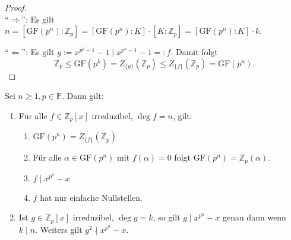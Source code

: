 \begin{proof}{\ } \\
    ``$\Rightarrow$'': Es gilt $n = [\mathrm{GF}(p^n) : \mathbb{Z}_p] = [\mathrm{GF}(p^n) : K] \cdot [K : \mathbb{Z}_p] = [\mathrm{GF}(p^n) : K] \cdot k$.

    ``$\Leftarrow$'': Es gilt $g := x^{p^k - 1} - 1 \mid x^{p^n - 1} - 1 =: f$.
    Damit folgt
    $$ \mathbb{Z}_p \leq \mathrm{GF}(p^k) = Z_{\{g\}}(\mathbb{Z}_p) \leq Z_{\{f\}}(\mathbb{Z}_p) = \mathrm{GF}(p^n). $$
\end{proof}

\begin{lemma}\label{lemma:irreduzible-polynome-ueber-Z_p}
    Sei $n \geq 1, p \in \mathbb{P}$. Dann gilt:
    \begin{enumerate}
        \item Für alle $f \in \mathbb{Z}_p[x]$ irreduzibel, $\deg f = n$, gilt:
        \begin{enumerate}
            \item $\mathrm{GF}(p^n) = Z_{\{f\}}(\mathbb{Z}_p)$
            \item Für alle $\alpha \in \mathrm{GF}(p^n)$ mit $f(\alpha) = 0$ folgt $\mathrm{GF}(p^n) = \mathbb{Z}_p(\alpha)$.
            \item $f \mid x^{p^n} - x$
            \item $f$ hat nur einfache Nullstellen.
        \end{enumerate}
        \item Ist $g \in \mathbb{Z}_p[x]$ irreduzibel, $\deg g = k$, so gilt $g \mid x^{p^n} - x$ genau dann wenn $k \mid n$. Weiters gilt $g^2 \nmid x^{p^n} - x$.
    \end{enumerate}
\end{lemma}

